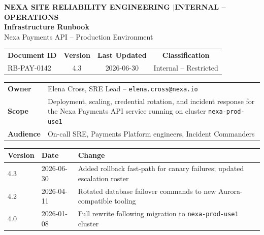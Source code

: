 \documentclass[11pt,a4paper,parskip=half]{scrartcl}
\begin{document}
\pagestyle{empty}

\begin{tcolorbox}[
  enhanced, colback=navy, colframe=navy, coltext=paper,
  boxrule=0pt, arc=0mm, left=6mm, right=6mm, top=5mm, bottom=5mm,
  sharp corners
]
{\color{teal!70!white}\footnotesize\bfseries NEXA SITE RELIABILITY ENGINEERING \quad$\vert$\quad INTERNAL -- OPERATIONS}\\[3mm]
{\color{white}\Huge\bfseries Infrastructure Runbook}\\[1.5mm]
{\color{hair}\Large Nexa Payments API -- Production Environment}
\end{tcolorbox}

\vspace{3mm}
\begin{tabularx}{\linewidth}{@{}Xccc@{}}
\rowcolor{navy!6}
\textbf{\color{navy}Document ID} & \textbf{\color{navy}Version} & \textbf{\color{navy}Last Updated} & \textbf{\color{navy}Classification} \\
RB-PAY-0142 & 4.3 & 2026-06-30 & Internal -- Restricted
\end{tabularx}

\vspace{4mm}
{\small
\begin{tabularx}{\linewidth}{@{}l X@{}}
\textbf{Owner} & Elena Cross, SRE Lead -- \texttt{elena.cross@nexa.io} \\
\textbf{Scope} & Deployment, scaling, credential rotation, and incident response for the Nexa Payments API service running on cluster \texttt{nexa-prod-use1} \\
\textbf{Audience} & On-call SRE, Payments Platform engineers, Incident Commanders \\
\end{tabularx}
}

\vspace{2mm}
{\small\color{slate}
\begin{tabularx}{\linewidth}{@{}p{1.6cm}p{1.6cm}X@{}}
\toprule
\textbf{Version} & \textbf{Date} & \textbf{Change} \\
\midrule
4.3 & 2026-06-30 & Added rollback fast-path for canary failures; updated escalation roster \\
4.2 & 2026-04-11 & Rotated database failover commands to new Aurora-compatible tooling \\
4.0 & 2026-01-08 & Full rewrite following migration to \texttt{nexa-prod-use1} cluster \\
\bottomrule
\end{tabularx}
}
\end{document}
